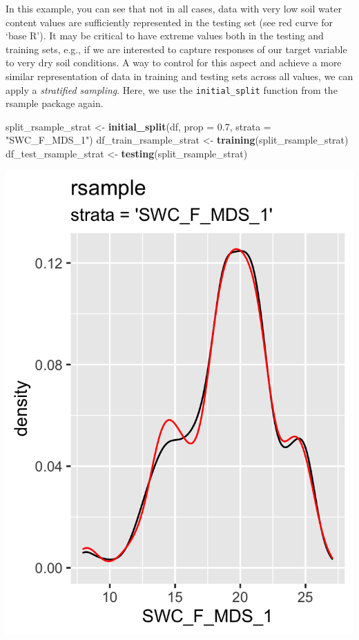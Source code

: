 \documentclass[
]{book}
\newenvironment{Shaded}{\begin{snugshade}}{\end{snugshade}}
\newcommand{\DataTypeTok}[1]{\textcolor[rgb]{0.13,0.29,0.53}{#1}}
\newcommand{\FloatTok}[1]{\textcolor[rgb]{0.00,0.00,0.81}{#1}}
\newcommand{\KeywordTok}[1]{\textcolor[rgb]{0.13,0.29,0.53}{\textbf{#1}}}
\newcommand{\NormalTok}[1]{#1}
\newcommand{\StringTok}[1]{\textcolor[rgb]{0.31,0.60,0.02}{#1}}
\begin{document}
In this example, you can see that not in all cases, data with very low soil water content values are sufficiently represented in the testing set (see red curve for `base R'). It may be critical to have extreme values both in the testing and training sets, e.g., if we are interested to capture responses of our target variable to very dry soil conditions. A way to control for this aspect and achieve a more similar representation of data in training and testing sets across all values, we can apply a \emph{stratified sampling}. Here, we use the \texttt{initial\_split} function from the rsample package again.

\begin{Shaded}
\begin{Highlighting}[]
\NormalTok{split_rsample_strat <-}\StringTok{ }\KeywordTok{initial_split}\NormalTok{(df, }\DataTypeTok{prop =} \FloatTok{0.7}\NormalTok{, }\DataTypeTok{strata =} \StringTok{"SWC_F_MDS_1"}\NormalTok{)}
\NormalTok{df_train_rsample_strat <-}\StringTok{ }\KeywordTok{training}\NormalTok{(split_rsample_strat)}
\NormalTok{df_test_rsample_strat <-}\StringTok{ }\KeywordTok{testing}\NormalTok{(split_rsample_strat)}
\end{Highlighting}
\end{Shaded}

\includegraphics{./figures/datasplitting_strata.png}
\end{document}
